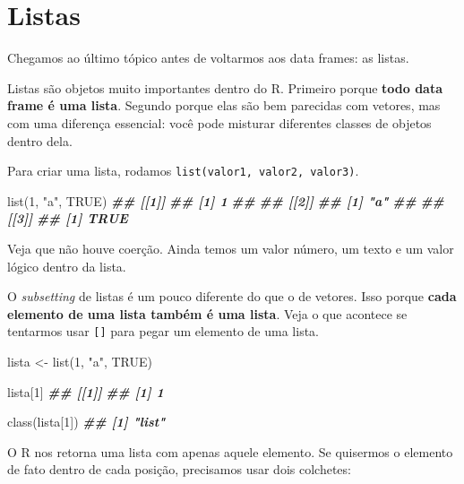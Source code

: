 \documentclass[
]{book}
\newenvironment{Shaded}{\begin{snugshade}}{\end{snugshade}}
\newcommand{\ConstantTok}[1]{\textcolor[rgb]{0.00,0.00,0.00}{#1}}
\newcommand{\DecValTok}[1]{\textcolor[rgb]{0.00,0.00,0.81}{#1}}
\newcommand{\DocumentationTok}[1]{\textcolor[rgb]{0.56,0.35,0.01}{\textbf{\textit{#1}}}}
\newcommand{\FunctionTok}[1]{\textcolor[rgb]{0.00,0.00,0.00}{#1}}
\newcommand{\NormalTok}[1]{#1}
\newcommand{\OtherTok}[1]{\textcolor[rgb]{0.56,0.35,0.01}{#1}}
\newcommand{\StringTok}[1]{\textcolor[rgb]{0.31,0.60,0.02}{#1}}
\begin{document}
\hypertarget{listas}{%
\section{Listas}\label{listas}}

Chegamos ao último tópico antes de voltarmos aos data frames: as listas.

Listas são objetos muito importantes dentro do R. Primeiro porque \textbf{todo data frame é uma lista}. Segundo porque elas são bem parecidas com vetores, mas com uma diferença essencial: você pode misturar diferentes classes de objetos dentro dela.

Para criar uma lista, rodamos \texttt{list(valor1,\ valor2,\ valor3)}.

\begin{Shaded}
\begin{Highlighting}[]
\FunctionTok{list}\NormalTok{(}\DecValTok{1}\NormalTok{, }\StringTok{"a"}\NormalTok{, }\ConstantTok{TRUE}\NormalTok{)}
\DocumentationTok{\#\# [[1]]}
\DocumentationTok{\#\# [1] 1}
\DocumentationTok{\#\# }
\DocumentationTok{\#\# [[2]]}
\DocumentationTok{\#\# [1] "a"}
\DocumentationTok{\#\# }
\DocumentationTok{\#\# [[3]]}
\DocumentationTok{\#\# [1] TRUE}
\end{Highlighting}
\end{Shaded}

Veja que não houve coerção. Ainda temos um valor número, um texto e um valor lógico dentro da lista.

O \emph{subsetting} de listas é um pouco diferente do que o de vetores. Isso porque \textbf{cada elemento de uma lista também é uma lista}. Veja o que acontece se tentarmos usar \texttt{{[}{]}} para pegar um elemento de uma lista.

\begin{Shaded}
\begin{Highlighting}[]
\NormalTok{lista }\OtherTok{\textless{}{-}} \FunctionTok{list}\NormalTok{(}\DecValTok{1}\NormalTok{, }\StringTok{"a"}\NormalTok{, }\ConstantTok{TRUE}\NormalTok{)}

\NormalTok{lista[}\DecValTok{1}\NormalTok{]}
\DocumentationTok{\#\# [[1]]}
\DocumentationTok{\#\# [1] 1}

\FunctionTok{class}\NormalTok{(lista[}\DecValTok{1}\NormalTok{])}
\DocumentationTok{\#\# [1] "list"}
\end{Highlighting}
\end{Shaded}

O R nos retorna uma lista com apenas aquele elemento. Se quisermos o elemento de fato dentro de cada posição, precisamos usar dois colchetes:
\end{document}

